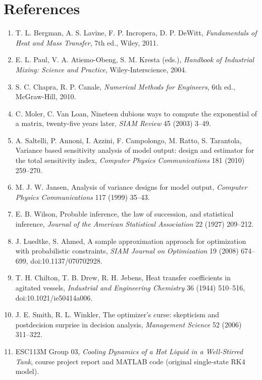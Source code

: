 \documentclass[11pt,letterpaper]{article}
\begin{document}
\section{References}
{\small
\begin{enumerate}[label=\arabic*.,leftmargin=*]
\item T. L. Bergman, A. S. Lavine, F. P. Incropera, D. P. DeWitt, \emph{Fundamentals of Heat and Mass Transfer}, 7th ed., Wiley, 2011.
\item E. L. Paul, V. A. Atiemo-Obeng, S. M. Kresta (eds.), \emph{Handbook of Industrial Mixing: Science and Practice}, Wiley-Interscience, 2004.
\item S. C. Chapra, R. P. Canale, \emph{Numerical Methods for Engineers}, 6th ed., McGraw-Hill, 2010.
\item C. Moler, C. Van Loan, Nineteen dubious ways to compute the exponential of a matrix, twenty-five years later, \emph{SIAM Review} 45 (2003) 3--49.
\item A. Saltelli, P. Annoni, I. Azzini, F. Campolongo, M. Ratto, S. Tarantola, Variance based sensitivity analysis of model output: design and estimator for the total sensitivity index, \emph{Computer Physics Communications} 181 (2010) 259--270.
\item M. J. W. Jansen, Analysis of variance designs for model output, \emph{Computer Physics Communications} 117 (1999) 35--43.
\item E. B. Wilson, Probable inference, the law of succession, and statistical inference, \emph{Journal of the American Statistical Association} 22 (1927) 209--212.
\item J. Luedtke, S. Ahmed, A sample approximation approach for optimization with probabilistic constraints, \emph{SIAM Journal on Optimization} 19 (2008) 674--699, doi:10.1137/070702928.
\item T. H. Chilton, T. B. Drew, R. H. Jebens, Heat transfer coefficients in agitated vessels, \emph{Industrial and Engineering Chemistry} 36 (1944) 510--516, doi:10.1021/ie50414a006.
\item J. E. Smith, R. L. Winkler, The optimizer's curse: skepticism and postdecision surprise in decision analysis, \emph{Management Science} 52 (2006) 311--322.
\item ESC113M Group 03, \emph{Cooling Dynamics of a Hot Liquid in a Well-Stirred Tank}, course project report and MATLAB code (original single-state RK4 model).
\end{enumerate}}

\clearpage
\appendix
\end{document}
